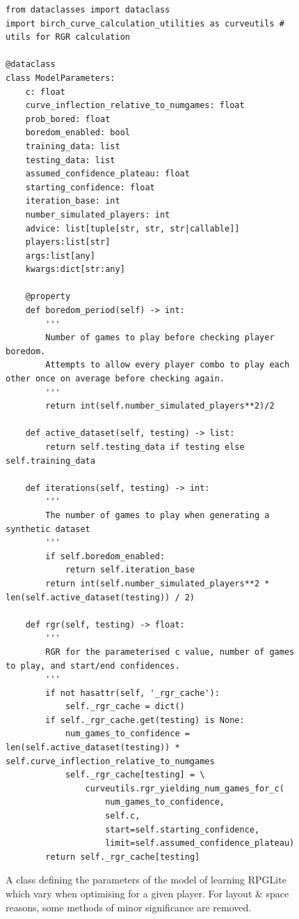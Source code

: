 \begin{figure}
  \begin{center}
    \begin{lstlisting}
from dataclasses import dataclass
import birch_curve_calculation_utilities as curveutils # utils for RGR calculation

@dataclass
class ModelParameters:
    c: float
    curve_inflection_relative_to_numgames: float
    prob_bored: float
    boredom_enabled: bool
    training_data: list
    testing_data: list
    assumed_confidence_plateau: float
    starting_confidence: float
    iteration_base: int
    number_simulated_players: int
    advice: list[tuple[str, str, str|callable]]
    players:list[str]
    args:list[any]
    kwargs:dict[str:any]

    @property
    def boredom_period(self) -> int:
        '''
        Number of games to play before checking player boredom.
        Attempts to allow every player combo to play each other once on average before checking again.
        '''
        return int(self.number_simulated_players**2)/2

    def active_dataset(self, testing) -> list:
        return self.testing_data if testing else self.training_data

    def iterations(self, testing) -> int:
        '''
        The number of games to play when generating a synthetic dataset
        '''
        if self.boredom_enabled:
            return self.iteration_base
        return int(self.number_simulated_players**2 * len(self.active_dataset(testing)) / 2)

    def rgr(self, testing) -> float:
        '''
        RGR for the parameterised c value, number of games to play, and start/end confidences.
        '''
        if not hasattr(self, '_rgr_cache'):
            self._rgr_cache = dict()
        if self._rgr_cache.get(testing) is None:
            num_games_to_confidence = len(self.active_dataset(testing)) * self.curve_inflection_relative_to_numgames
            self._rgr_cache[testing] = \
                curveutils.rgr_yielding_num_games_for_c(
                    num_games_to_confidence,
                    self.c,
                    start=self.starting_confidence,
                    limit=self.assumed_confidence_plateau)
        return self._rgr_cache[testing]
    \end{lstlisting}
  \end{center}
  \caption{A class defining the parameters of the model of learning RPGLite which vary when optimising for a given player. For layout \& space reasons, some methods of minor significance are removed.}
  \label{fig:model_parameters_class}
\end{figure}


